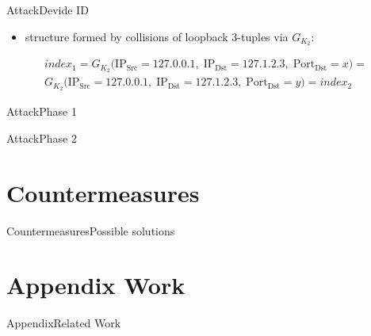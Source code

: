 \documentclass[aspectratio=169, hyperref={colorlinks=true, allcolors=SecondaryColor}, c]{beamer}
\begin{document}
\begin{frame}[fragile]{Attack}{Devide ID}
	\begin{itemize}
		\item structure formed by \alert{collisions of loopback 3-tuples} via $G_{K_2}$:
	\end{itemize}
	\begin{equation*}
		\begin{split}
			index_1 = G_{K_{2}}\bigl(
			\mathrm{IP}_{\mathrm{Src}} = 127.0.0.1,\;
			\mathrm{IP}_{\mathrm{Dst}} = 127.1.2.3,\;
			\mathrm{Port}_{\mathrm{Dst}} = x
			\bigr)
			= \\
			G_{K_{2}}\bigl(
			\mathrm{IP}_{\mathrm{Src}} = 127.0.0.1,\;
			\mathrm{IP}_{\mathrm{Dst}} = 127.1.2.3,\;
			\mathrm{Port}_{\mathrm{Dst}} = y
			\bigr) = index_2
		\end{split}
	\end{equation*}
\end{frame}

\begin{frame}[fragile]{Attack}{Phase 1}
	\begin{center}
		\begin{adjustbox}{scale=0.7}
			
		\end{adjustbox}
	\end{center}
\end{frame}

\begin{frame}[fragile]{Attack}{Phase 2}
	\begin{center}
		\begin{adjustbox}{scale=0.7}
			
		\end{adjustbox}
	\end{center}
\end{frame}

\section{Countermeasures}

\begin{frame}[fragile]{Countermeasures}{Possible solutions}
\end{frame}

\section{Appendix Work}

\begin{frame}[fragile]{Appendix}{Related Work}
\end{frame}
\end{document}

